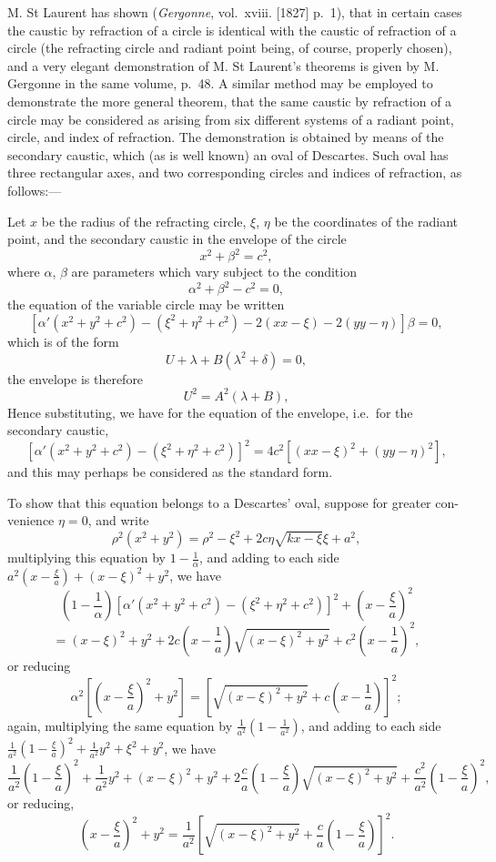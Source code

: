 \documentclass[11pt,a4paper]{article}
\theoremstyle{definition}
\begin{document}
M. St Laurent has shown (\textit{Gergonne}, vol.\ xviii. [1827] p.\ 1), that in certain cases
the caustic by refraction of a circle is identical with the caustic of refraction of a circle
(the refracting circle and radiant point being, of course, properly chosen), and a very
elegant demonstration of M. St Laurent's theorems is given by M. Gergonne in the
same volume, p.\ 48. A similar method may be employed to demonstrate the more
general theorem, that the same caustic by refraction of a circle may be considered as
arising from six different systems of a radiant point, circle, and index of refraction.
The demonstration is obtained by means of the secondary caustic, which (as is well
known) an oval of Descartes. Such oval has three rectangular axes, and two
corresponding circles and indices of refraction, as follows:---

\medskip

Let $x$ be the radius of the refracting circle, $\xi$, $\eta$ be the coordinates of the radiant point,
and the secondary caustic in the envelope of the circle
\[
x^2 + \beta^2 = c^2,
\]
where $\alpha$, $\beta$ are parameters which vary subject to the condition
\[
\alpha^2 + \beta^2 - c^2 = 0,
\]
the equation of the variable circle may be written
\[
[\alpha'(x^2+y^2+c^2)-(\xi^2+\eta^2+c^2)-2(xx-\xi)-2(yy-\eta)]\beta = 0,
\]
which is of the form
\[
U + \lambda + B(\lambda^2 + \delta) = 0,
\]
the envelope is therefore
\[
U^2 = A^2(\lambda + B),
\]
Hence substituting, we have for the equation of the envelope, i.e.\ for the secondary
caustic,
\[
[\alpha'(x^2+y^2+c^2)-(\xi^2+\eta^2+c^2)]^2 = 4c^2[(xx-\xi)^2+(yy-\eta)^2],
\]
and this may perhaps be considered as the standard form.

\medskip

To show that this equation belongs to a Descartes' oval, suppose for greater con-
venience $\eta=0$, and write
\[
\rho^2(x^2+y^2)=\rho^2-\xi^2+2c\eta\sqrt{kx-\xi}\xi+a^2,
\]
multiplying this equation by $1-\tfrac{1}{\alpha}$, and adding to each side $a^2\left(x-\tfrac{\xi}{a}\right)+(x-\xi)^2 + y^2$,
we have
\[
\left(1-\frac{1}{\alpha}\right)[\alpha'(x^2+y^2+c^2)-(\xi^2+\eta^2+c^2)]^2+\left(x-\frac{\xi}{a}\right)^2
\]
\[
=(x-\xi)^2+y^2+2c\left(x-\frac{1}{a}\right)\sqrt{(x-\xi)^2+y^2}+c^2\left(x-\frac{1}{a}\right)^2,
\]
or reducing
\[
\alpha^2\left[\left(x-\frac{\xi}{a}\right)^2+y^2\right]=\left[\sqrt{(x-\xi)^2+y^2}+c\left(x-\frac{1}{a}\right)\right]^2;
\]
again, multiplying the same equation by $\tfrac{1}{a^2}\left(1-\tfrac{1}{a^2}\right)$, and adding to each side
$\tfrac{1}{a^2}\left(1-\tfrac{\xi}{a}\right)^2+\tfrac{1}{a^2}y^2+\xi^2+y^2$,
we have
\[
\frac{1}{a^2}\left(1-\frac{\xi}{a}\right)^2+\frac{1}{a^2}y^2+(x-\xi)^2+y^2+2\frac{c}{a}\left(1-\frac{\xi}{a}\right)\sqrt{(x-\xi)^2+y^2}+\frac{c^2}{a^2}\left(1-\frac{\xi}{a}\right)^2,
\]
or reducing,
\[
\left(x-\frac{\xi}{a}\right)^2+y^2=\frac{1}{a^2}\left[\sqrt{(x-\xi)^2+y^2}+\frac{c}{a}\left(1-\frac{\xi}{a}\right)\right]^2.
\]
\end{document}
